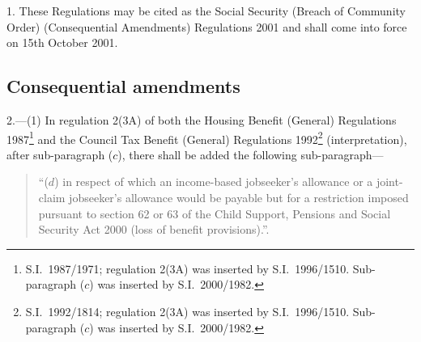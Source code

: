\documentclass[12pt,a4paper]{article}
\begin{document}
1.  These Regulations may be cited as the Social Security (Breach of Community Order) (Consequential Amendments) Regulations 2001 and shall come into force on 15th October 2001.

\subsection[2. Consequential amendments]{Consequential amendments}

2.---(1)  In regulation 2(3A) of both the Housing Benefit (General) Regulations 1987\footnote{S.I.\ 1987/1971; regulation 2(3A) was inserted by S.I.\ 1996/1510. Sub-paragraph ($c$) was inserted by S.I.\ 2000/1982.} and the Council Tax Benefit (General) Regulations 1992\footnote{S.I.\ 1992/1814; regulation 2(3A) was inserted by S.I.\ 1996/1510. Sub-paragraph ($c$) was inserted by S.I.\ 2000/1982.} (interpretation), after sub-paragraph ($c$), there shall be added the following sub-paragraph—
\begin{quotation}
“($d$)  in respect of which an income-based jobseeker’s allowance or a joint-claim jobseeker’s allowance would be payable but for a restriction imposed pursuant to section 62 or 63 of the Child Support, Pensions and Social Security Act 2000 (loss of benefit provisions).”.
\end{quotation}
\end{document}
